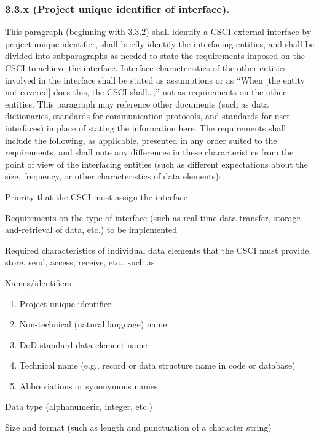\subsubsection{3.3.x (Project unique identifier of interface).}

This paragraph (beginning with 3.3.2) shall identify a CSCI external
interface by project unique identifier, shall briefly identify the
interfacing entities, and shall be divided into subparagraphs as needed
to state the requirements imposed on the CSCI to achieve the interface.
Interface characteristics of the other entities involved in the
interface shall be stated as assumptions or as ``When {[}the entity not
covered{]} does this, the CSCI shall\ldots{},'' not as requirements on
the other entities. This paragraph may reference other documents (such
as data dictionaries, standards for communication protocols, and
standards for user interfaces) in place of stating the information here.
The requirements shall include the following, as applicable, presented
in any order suited to the requirements, and shall note any differences
in these characteristics from the point of view of the interfacing
entities (such as different expectations about the size, frequency, or
other characteristics of data elements):

Priority that the CSCI must assign the interface

Requirements on the type of interface (such as real-time data transfer,
storage-and-retrieval of data, etc.) to be implemented

Required characteristics of individual data elements that the CSCI must
provide, store, send, access, receive, etc., such as:

Names/identifiers

\begin{enumerate}
\itemsep1pt\parskip0pt
\item
  Project-unique identifier
\item
  Non-technical (natural language) name
\item
  DoD standard data element name
\item
  Technical name (e.g., record or data structure name in code or
  database)
\item
  Abbreviations or synonymous names
\end{enumerate}

Data type (alphanumeric, integer, etc.)

Size and format (such as length and punctuation of a character string)

